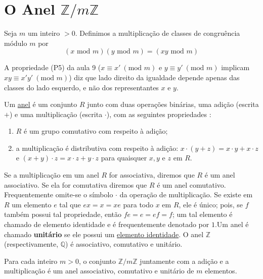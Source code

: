 \section{O Anel \texorpdfstring{$\mathbb{Z}/m\mathbb{Z}$}{Z/mZ}}

Seja $m$ um inteiro $> 0$. Definimos a multiplicação de classes de congruência módulo $m$ por 
\[
    (x \text{ mod } m) (y \text{ mod } m) = (xy \text{ mod } m) 
\]

A propriedade (P5) da aula 9 ($x \equiv x'\ (\text{mod } m)$ e $y \equiv y'\ (\text{mod } m)$ implicam
$xy \equiv x'y'\ (\text{mod } m)$) diz que lado direito da igualdade depende apenas das classes do lado
esquerdo, e não dos representantes $x$ e $y$.

\begin{definicao}
Um \underline{anel} é um conjunto $R$ junto com duas operações binárias, uma adição (escrita $+$)
e uma multiplicação (escrita $\cdot$), com as seguintes propriedades :

\begin{enumerate}[label=\textbf{A\arabic*.}, left=0.5cm, align=left, nosep]
    \item $R$ é um grupo comutativo com respeito à adição;
    \item a multiplicação é distributiva com respeito à adição: $x \cdot (y + z) = x \cdot y + x \cdot z$
    e $(x + y) \cdot z = x \cdot z + y \cdot z$ para quaisquer $x, y$ e $z$ em $R$.
\end{enumerate}

\end{definicao}

Se a multiplicação em um anel $R$ for associativa, diremos que $R$ é um anel associativo. Se ela for comutativa
diremos que $R$ é um anel comutativo. Frequentemente omite-se o símbolo $\cdot$ da operação de multiplicação. Se 
existe em $R$ um elemento $e$ tal que $ex = x = xe$ para todo $x$ em $R$, ele é único; pois, se $f$ também possui tal 
propriedade, então $fe = e = ef = f$; um tal elemento é chamado de elemento identidade e é frequentemente denotado 
por $1$.Um anel é chamado \textbf{unitário} se ele possui um \underline{elemento identidade}. O anel $\mathbb{Z}$ (respectivamente, $\mathbb{Q}$)
é associativo, comutativo e unitário.

\begin{proposicao}
Para cada inteiro $m > 0$, o conjunto $\mathbb{Z}/m\mathbb{Z}$ juntamente com a adição e a multiplicação é um anel associativo, 
comutativo e unitário de $m$ elementos.
\end{proposicao}

